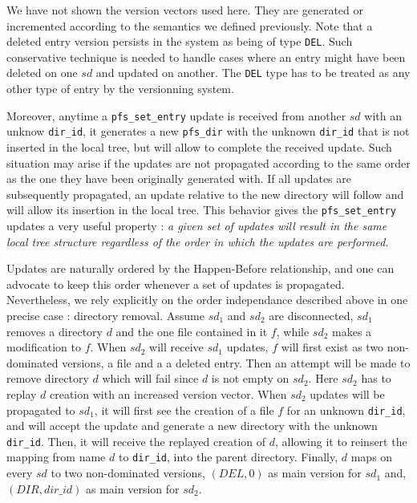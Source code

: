 We have not shown the version vectors used here. They are generated or
incremented according to the semantics we defined previously. Note
that a deleted entry version persists in the system as being of type
{\tt DEL}. Such conservative technique is needed to handle cases where
an entry might have been deleted on one $sd$ and updated on
another. The {\tt DEL} type has to be treated as any other type of
entry by the versionning system.

Moreover, anytime a {\tt pfs\_set\_entry} update is received from
another $sd$ with an unknow {\tt dir\_id}, it generates a new {\tt pfs\_dir}
with the unknown {\tt dir\_id} that is not inserted in the local tree, but
will allow to complete the received update. Such situation may arise
if the updates are not propagated according to the same order as the one they
have been originally generated with. If all updates are subsequently
propagated, an update relative to the new directory will follow and will
allow its insertion in the local tree. This behavior gives the 
{\tt pfs\_set\_entry} updates a very useful property : \emph{a given set of
updates will result in the same local tree structure regardless of the
order in which the updates are performed.}

Updates are naturally ordered by the Happen-Before relationship, and
one can advocate to keep this order whenever a set of updates is
propagated. Nevertheless, we rely explicitly on the order independance
described above in one precise case : directory removal. Assume
$sd_{1}$ and $sd_{2}$ are disconnected, $sd_{1}$ removes a
directory $d$ and the one file contained in it $f$, while $sd_{2}$
makes a modification to $f$. When $sd_{2}$ will receive $sd_{1}$
updates, $f$ will first exist as two non-dominated versions, a file
and a a deleted entry. Then an attempt will be made to remove
directory $d$ which will fail since $d$ is not empty on $sd_{2}$. Here
$sd_{2}$ has to replay $d$ creation with an increased version
vector. When $sd_{2}$ updates will be propagated to $sd_{1}$, it will
first see the creation of a file $f$ for an unknown {\tt dir\_id}, and
will accept the update and generate a new directory with the unknown
{\tt dir\_id}. Then, it will receive the replayed creation of $d$,
allowing it to reinsert the mapping from name $d$ to {\tt dir\_id}, into
the parent directory. Finally, $d$ maps on every $sd$ to two non-dominated
versions, $(DEL,0)$ as main version for $sd_{1}$ and, $(DIR, dir\_id)$ as main version
for $sd_{2}$.


